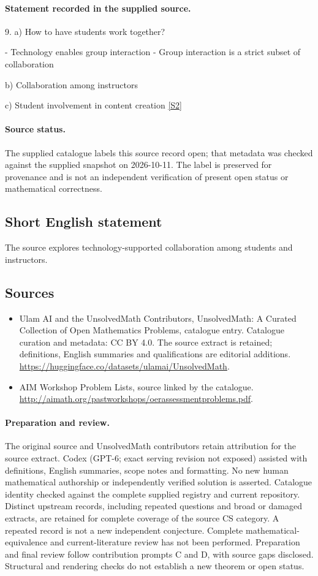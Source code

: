 \documentclass[11pt]{article}
\begin{document}
\paragraph{Statement recorded in the supplied source.}
9. a) How to have students work together?

- Technology enables group interaction - Group interaction is a strict subset of collaboration

b) Collaboration among instructors

c) Student involvement in content creation \href{http://aimath.org/pastworkshops/oerassessmentproblems.pdf}{[S2]}
\paragraph{Source status.}
The supplied catalogue labels this source record open; that metadata was checked against the supplied snapshot on 2026-10-11. The label is preserved for provenance and is not an independent verification of present open status or mathematical correctness.
\subsection{Short English statement}
The source explores technology-supported collaboration among students and instructors.
\subsection{Sources}
\begin{itemize}
\item[S1] Ulam AI and the UnsolvedMath Contributors, UnsolvedMath: A Curated Collection of Open Mathematics Problems, catalogue entry. Catalogue curation and metadata: CC BY 4.0. The source extract is retained; definitions, English summaries and qualifications are editorial additions.
\url{https://huggingface.co/datasets/ulamai/UnsolvedMath}.
\item[S2] AIM Workshop Problem Lists, source linked by the catalogue.
\url{http://aimath.org/pastworkshops/oerassessmentproblems.pdf}.
\end{itemize}
\paragraph{Preparation and review.}
The original source and UnsolvedMath contributors retain attribution for the source extract. Codex (GPT-6; exact serving revision not exposed) assisted with definitions, English summaries, scope notes and formatting. No new human mathematical authorship or independently verified solution is asserted. Catalogue identity checked against the complete supplied registry and current repository. Distinct upstream records, including repeated questions and broad or damaged extracts, are retained for complete coverage of the source CS category. A repeated record is not a new independent conjecture. Complete mathematical-equivalence and current-literature review has not been performed. Preparation and final review follow contribution prompts C and D, with source gaps disclosed. Structural and rendering checks do not establish a new theorem or open status.
\label{end:statement}
\end{document}
